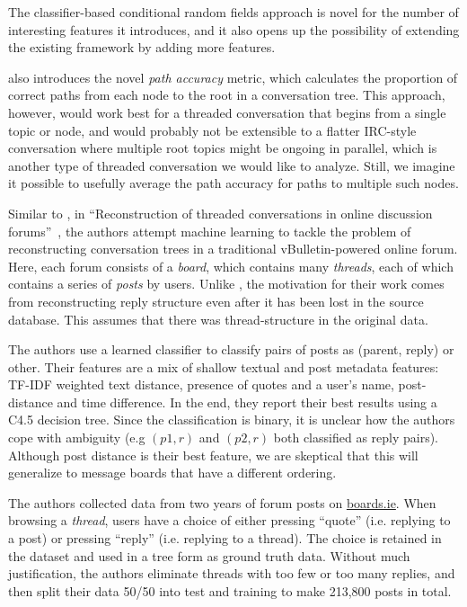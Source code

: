\documentclass[11pt]{article}
\newcommand{\titlecite}[2]{``#1''~\cite{#2}}
\begin{document}
The classifier-based conditional random fields approach is novel for the number
of interesting features it introduces, and it also opens up the possibility of
extending the existing framework by adding more features.

\cite{Wang2011a} also introduces the novel \emph{path accuracy} metric, which
calculates the proportion of correct paths from each node to the root in a
conversation tree. This approach, however, would work best for a threaded
conversation that begins from a single topic or node, and would probably not be
extensible to a flatter IRC-style conversation where multiple root topics might
be ongoing in parallel, which is another type of threaded conversation we would
like to analyze. Still, we imagine it possible to usefully average the path
accuracy for paths to multiple such nodes.

Similar to \cite{Wang2011a}, in \titlecite{Reconstruction of threaded
conversations in online discussion forums}{Aumayr2011a}, the authors attempt machine learning to 
tackle the problem of reconstructing conversation trees in a traditional
vBulletin-powered online forum. Here, each forum consists of a \textit{board}, which
contains many \textit{threads}, each of which contains a series of
\textit{posts} by users. Unlike \cite{Wang2008a}, the motivation for their work
comes from reconstructing reply structure even after it has been lost in the
source database. This assumes that there was thread-structure in the original
data.

The authors use a learned classifier to classify pairs of posts as (parent,
reply) or other. Their features are a mix of shallow textual and post
metadata features: TF-IDF weighted text distance, presence of quotes and a
user's name, post-distance and time difference. In the end, they report their 
best results using a C4.5 decision tree. Since the classification is binary, it 
is unclear how the authors cope with ambiguity (e.g $(p1, r)$ and $(p2,r)$ both 
classified as reply pairs). Although post distance is their best feature, we are skeptical
that this will generalize to message boards that have a different ordering.

The authors collected data from two years of forum posts on
\url{boards.ie}. When browsing a \textit{thread}, users have a choice of either
pressing ``quote'' (i.e. replying to a post) or pressing ``reply'' (i.e.
replying to a thread). The choice is retained in the dataset and used in a
tree form as ground truth data. Without much justification, the authors eliminate
threads with too few or too many replies, and then split their data 50/50 into 
test and training to make 213,800 posts in total.
\end{document}
